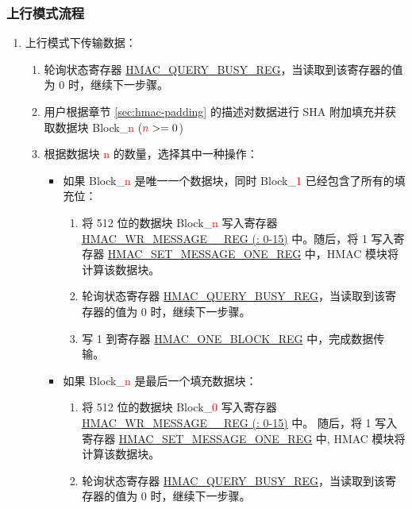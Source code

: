 \documentclass[main\_\_CN.tex]{subfiles}
\begin{document}
\subsubsection{上行模式流程}
\label{sec:hmac-upstream-process}

\begin{enumerate}

    \item 上行模式下传输数据：
    \begin{enumerate}
        \item 轮询状态寄存器 \hyperref[regdesc:HMACQUERYBUSYREG]{HMAC\_QUERY\_BUSY\_REG}，当读取到该寄存器的值为 0 时，继续下一步骤。
        \item 用户根据章节 \ref{sec:hmac-padding} 的描述对数据进行 SHA 附加填充并获取数据块 Block\_\textcolor{red}{n} ($\textcolor{red}{n}>=0$)
        \item 根据数据块 \textcolor{red}{n} 的数量，选择其中一种操作：
        \begin{itemize}
            \item 如果 Block\_\textcolor{red}{n} 是唯一一个数据块，同时 Block\_\textcolor{red}{1} 已经包含了所有的填充位：
            \begin{enumerate}
                \item 将 512 位的数据块 Block\_\textcolor{red}{n} 写入寄存器  \hyperref[regdesc:HMACWRMESSAGENREG]
                {HMAC\_WR\_MESSAGE\_\_REG (: 0-15)} 中。随后，将 1 写入寄存器 \hyperref[regdesc:HMACSETMESSAGEONEREG]{HMAC\_SET\_MESSAGE\_ONE\_REG} 中，HMAC 模块将计算该数据块。
                \item 轮询状态寄存器 \hyperref[regdesc:HMACQUERYBUSYREG]{HMAC\_QUERY\_BUSY\_REG}，当读取到该寄存器的值为 0 时，继续下一步骤。
                \item 写 1 到寄存器 \hyperref[regdesc:HMACONEBLOCKREG]{HMAC\_ONE\_BLOCK\_REG} 中，完成数据传输。
            \end{enumerate}
            \item 如果 Block\_\textcolor{red}{n} 是最后一个填充数据块：
            \begin{enumerate}
                \item 将 512 位的数据块 Block\_\textcolor{red}{0} 写入寄存器 \hyperref[regdesc:HMACWRMESSAGENREG]
                {HMAC\_WR\_MESSAGE\_\_REG (: 0-15)} 中。 随后，将 1 写入寄存器 \hyperref[regdesc:HMACSETMESSAGEONEREG]{HMAC\_SET\_MESSAGE\_ONE\_REG} 中, HMAC 模块将计算该数据块。
                \item 轮询状态寄存器 \hyperref[regdesc:HMACQUERYBUSYREG]{HMAC\_QUERY\_BUSY\_REG}，当读取到该寄存器的值为 0 时，继续下一步骤。

\end{enumerate}
\end{itemize}
\end{enumerate}
\end{enumerate}
\end{document}
